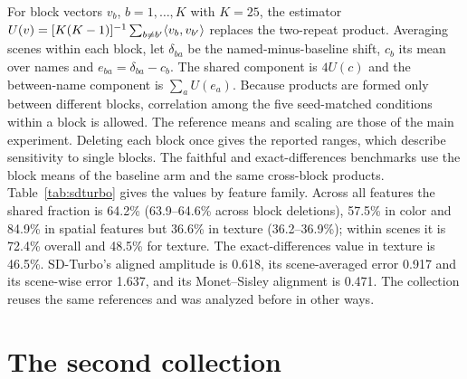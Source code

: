 For block vectors $v_b$, $b=1,\dots,K$ with $K=25$, the estimator
$U(v)=[K(K-1)]^{-1}\sum_{b\ne b'}\langle v_b,v_{b'}\rangle$ replaces the two-repeat product. Averaging
scenes within each block, let $\delta_{ba}$ be the named-minus-baseline shift, $c_b$ its mean
over names and $e_{ba}=\delta_{ba}-c_b$. The shared component is $4U(c)$ and the between-name
component is $\sum_aU(e_a)$. Because products are formed only between different blocks,
correlation among the five seed-matched conditions within a block is allowed. The reference
means and scaling are those of the main experiment. Deleting each block once gives the reported
ranges, which describe sensitivity to single blocks. The faithful and exact-differences benchmarks use
the block means of the baseline arm and the same cross-block products. Table~\ref{tab:sdturbo}
gives the values by feature family. Across all features the shared fraction is 64.2\%
(63.9--64.6\% across block deletions), 57.5\% in color and 84.9\% in spatial features but 36.6\%
in texture (36.2--36.9\%); within scenes it is 72.4\% overall and 48.5\% for texture. The
exact-differences value in texture is 46.5\%. SD-Turbo's aligned amplitude is 0.618, its
scene-averaged error 0.917 and its scene-wise error 1.637, and its Monet--Sisley alignment is
0.471. The collection reuses the same references and was analyzed before in other ways.



\FloatBarrier
\section{The second collection}\label{app:second}

